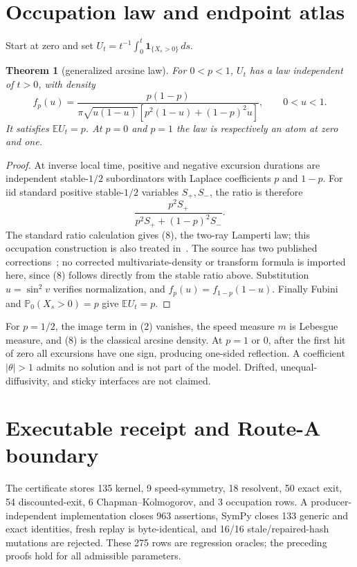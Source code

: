 \documentclass[10pt]{article}
\newtheorem{theorem}{Theorem}
\newcommand{\Prb}{\mathbb P}
\newcommand{\E}{\mathbb E}
\begin{document}
\section{Occupation law and endpoint atlas}
Start at zero and set
$U_t=t^{-1}\int_0^t\mathbf1_{\{X_s>0\}}\,ds$.
\begin{theorem}[generalized arcsine law]
For $0<p<1$, $U_t$ has a law independent of $t>0$, with density
\begin{equation}
 f_p(u)=\frac{p(1-p)}{\pi\sqrt{u(1-u)}
 [p^2(1-u)+(1-p)^2u]},\qquad0<u<1.
\end{equation}
It satisfies $\E U_t=p$.  At $p=0$ and $p=1$ the law is respectively an atom
at zero and one.
\end{theorem}
\begin{proof}
At inverse local time, positive and negative excursion durations are
independent stable-$1/2$ subordinators with Laplace coefficients $p$ and
$1-p$.  For iid standard positive stable-$1/2$ variables $S_+,S_-$, the
ratio is therefore
\[
\frac{p^2S_+}{p^2S_++(1-p)^2S_-}.
\]
The standard ratio calculation gives (8), the two-ray Lamperti law; this
occupation construction is also treated in~\cite{ABTWW}.  The source has two
published corrections~\cite{ABTWWe,ABTWWse}; no corrected multivariate-density
or transform formula is imported here, since (8) follows directly from the
stable ratio above.  Substitution
$u=\sin^2 v$ verifies normalization, and
$f_p(u)=f_{1-p}(1-u)$.  Finally Fubini and
$\Prb_0(X_s>0)=p$ give $\E U_t=p$.
\end{proof}

For $p=1/2$, the image term in (2) vanishes, the speed measure $m$ is Lebesgue
measure, and
(8) is the classical arcsine density.  At $p=1$ or $0$, after the first hit
of zero all excursions have one sign, producing one-sided reflection.  A
coefficient $|\theta|>1$ admits no solution and is not part of the model.
Drifted, unequal-diffusivity, and sticky interfaces are not claimed.

\section{Executable receipt and Route-A boundary}
The certificate stores 135 kernel, 9 speed-symmetry, 18 resolvent, 50 exact
exit, 54 discounted-exit, 6 Chapman--Kolmogorov, and 3 occupation rows.  A
producer-independent implementation closes 963 assertions, SymPy closes 133
generic and exact identities, fresh replay is byte-identical, and 16/16
stale/repaired-hash mutations are rejected.  These 275 rows are regression
oracles; the preceding proofs hold for all admissible parameters.
\end{document}
